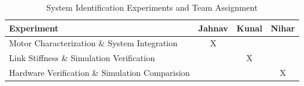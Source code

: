 \documentclass[12pt]{article}
\renewcommand{\arraystretch}{2} %
\begin{document}
\begin{table}[htbp]
\centering
\renewcommand{\arraystretch}{1.3}
\begin{tabular}{|p{}|c|c|c|}
\hline
\textbf{Experiment} & \textbf{Jahnav} & \textbf{Kunal} & \textbf{Nihar} \\
\hline
Motor Characterization \& System Integration & X & & \\
\hline
Link Stiffness \& Simulation Verification & & X & \\
\hline
Hardware Verification \& Simulation Comparision & & & X \\
\hline
\end{tabular}
\caption{System Identification Experiments and Team Assignment}
\label{tab:experiments}
\end{table}





    
\end{document}
